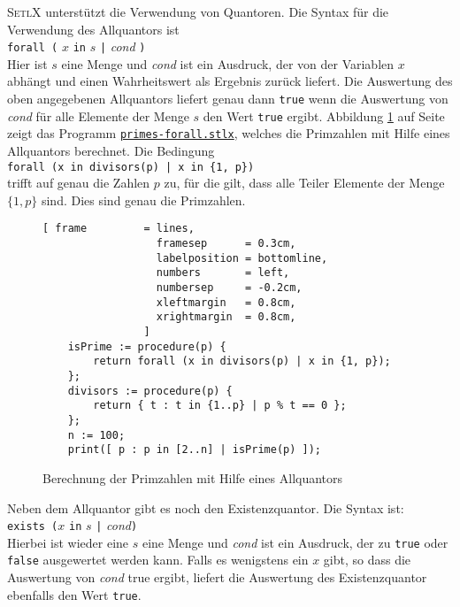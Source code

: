 \textsc{SetlX} unterstützt  die Verwendung von Quantoren.  Die Syntax für die Verwendung
des Allquantors ist
\\[0.2cm]
\hspace*{1.3cm}
\texttt{forall (} $x$ \texttt{in} $s$ \texttt{|} \textsl{cond} \texttt{)}
\\[0.2cm]
Hier ist $s$ eine Menge und \textsl{cond} ist ein Ausdruck, der von der Variablen $x$ abhängt und einen
Wahrheitswert als Ergebnis zurück liefert.  Die Auswertung des oben angegebenen Allquantors liefert genau
dann \texttt{true} wenn die Auswertung von \textsl{cond} für alle Elemente der Menge $s$ den Wert
\texttt{true} ergibt.  Abbildung \ref{fig:primes-forall.stlx} auf Seite
\pageref{fig:primes-forall.stlx} zeigt das Programm
\href{https://github.com/karlstroetmann/Logik/blob/master/SetlX/primes-forall.stlx}{\texttt{primes-forall.stlx}},
welches die  Primzahlen mit Hilfe eines Allquantors berechnet.
Die Bedingung
\\[0.2cm]
\hspace*{1.3cm}
\texttt{forall (x in divisors(p) | x in \{1, p\})}
\\[0.2cm]
trifft auf genau die Zahlen $p$ zu, für die gilt, dass alle Teiler Elemente der Menge $\{1,p\}$ sind.
Dies sind genau die Primzahlen.


\begin{figure}[!ht]
\centering
\begin{Verbatim}[ frame         = lines, 
                  framesep      = 0.3cm, 
                  labelposition = bottomline,
                  numbers       = left,
                  numbersep     = -0.2cm,
                  xleftmargin   = 0.8cm,
                  xrightmargin  = 0.8cm,
                ]
    isPrime := procedure(p) {
        return forall (x in divisors(p) | x in {1, p});
    };
    divisors := procedure(p) {
        return { t : t in {1..p} | p % t == 0 };
    };
    n := 100;
    print([ p : p in [2..n] | isPrime(p) ]);
\end{Verbatim}
\vspace*{-0.3cm}
\caption{Berechnung der Primzahlen mit Hilfe eines Allquantors}
\label{fig:primes-forall.stlx}
\end{figure}

Neben dem Allquantor gibt es noch den Existenzquantor. Die Syntax ist:
\\[0.2cm]
\hspace*{1.3cm}
\texttt{exists (}$x$ \texttt{in} $s$ \texttt{|} \textsl{cond}\texttt{)}
\\[0.2cm]
Hierbei ist wieder eine $s$ eine Menge und \textsl{cond} ist ein Ausdruck, der zu \texttt{true} oder
\texttt{false} ausgewertet werden kann.  Falls es wenigstens ein $x$ gibt, so dass die Auswertung von
\textsl{cond} true ergibt, liefert die Auswertung des Existenzquantor ebenfalls den Wert \texttt{true}.

